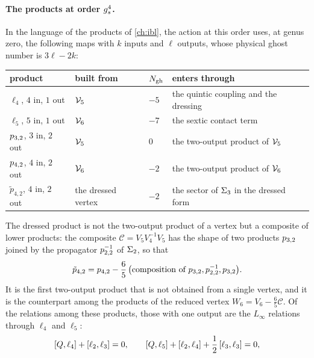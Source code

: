 \paragraph{The products at order $g_s^4$.}
In the language of the products of \cref{ch:ibl}, the action at this order uses, at genus zero, the following maps with $k$ inputs and $\ell$ outputs, whose physical ghost number is $3 \ell - 2 k$:
\begin{center}
  \small
  \begin{tabular}{llll}
    \toprule
    product                          & built from                                  & $N_{\text{gh}}$ & enters through                             \\
    \midrule
    $\ell_4$, $4$ in, $1$ out         & $\mathcal{V}_{5}$                                & $-5$   & the quintic coupling and the dressing      \\
    $\ell_5$, $5$ in, $1$ out         & $\mathcal{V}_{6}$                                & $-7$   & the sextic contact term                    \\
    $p_{3,2}$, $3$ in, $2$ out   & $\mathcal{V}_{5}$                                & $0$    & the two-output product of $\mathcal{V}_{5}$     \\
    $p_{4,2}$, $4$ in, $2$ out   & $\mathcal{V}_{6}$                                & $-2$   & the two-output product of $\mathcal{V}_{6}$     \\
    $\tilde p_{4, 2}$, $4$ in, $2$ out & the dressed vertex                          & $-2$   & the sector of $\Sigma_3$ in the dressed form \\
    \bottomrule
  \end{tabular}
\end{center}
The dressed product is not the two-output product of a vertex but a composite of lower products: the composite $\mathcal C = V_5 V_4^{-1} V_5$ has the shape of two products $p_{3,2}$ joined by the propagator $p_{2,2}^{-1}$ of $\Sigma_2$, so that
\begin{equation}
  \tilde p_{4, 2}
    = p_{4,2} - \frac65 \, \big( \text{composition of } p_{3,2}, p_{2,2}^{-1}, p_{3,2} \big).
\end{equation}
It is the first two-output product that is not obtained from a single vertex, and it is the counterpart among the products of the reduced vertex $W_6 = V_6 - \tfrac65 \mathcal C$.
Of the relations among these products, those with one output are the $L_\infty$ relations through $\ell_4$ and $\ell_5$:
\begin{equation}
  [ Q, \ell_4 ] + [ \ell_2, \ell_3 ]
    = 0,
  \qquad
  [ Q, \ell_5 ] + [ \ell_2, \ell_4 ] + \frac12 \, [ \ell_3, \ell_3 ]
    = 0,
\end{equation}
